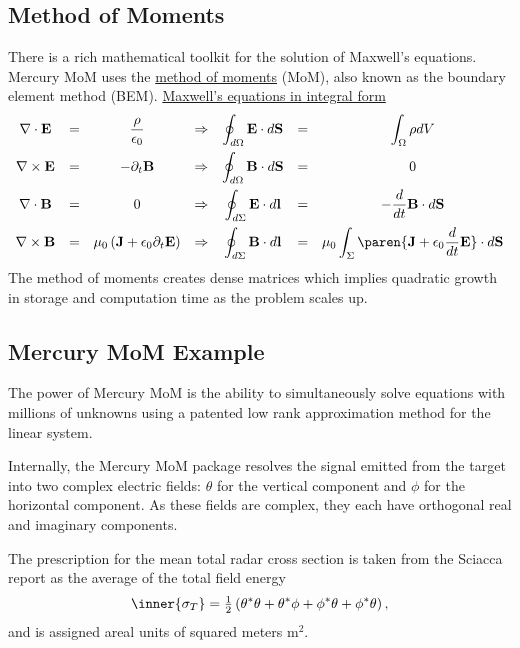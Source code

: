\subsection{Method of Moments}
There is a rich mathematical toolkit for the solution of Maxwell's equations. Mercury MoM uses the \href{https://en.wikipedia.org/wiki/Computational_electromagnetics#Method_of_moments_element_method}{method of moments} (MoM), also known as the boundary element method (BEM).
\href{https://en.wikipedia.org/wiki/Maxwell\%27s\_equations}{Maxwell's equations in integral form}
\begin{equation}
	\begin{array}{cccccccccc}
		\nabla \cdot \mathbf{E} &= &\displaystyle\frac{\rho}{\epsilon_{0}} 
			&\Rightarrow &\displaystyle{\oint_{d\Omega} \mathbf{E}\cdot d\mathbf{S}} &= &\displaystyle\int_{\Omega} \rho dV \\[10pt]
		\nabla \times \mathbf{E} &= &- \partial_{t}\mathbf{B} 
			&\Rightarrow &\displaystyle\oint_{d\Omega} \mathbf{B}\cdot d\mathbf{S} &= &0 \\[10pt]
		\nabla \cdot \mathbf{B} &= &0
			&\Rightarrow &\displaystyle\oint_{d\Sigma} \mathbf{E}\cdot d\mathbf{l} &= &\displaystyle-\frac{d}{dt} \mathbf{B}\cdot d\mathbf{S} \\[10pt]
		\nabla \times \mathbf{B} &= &\mu_{0} \left( \mathbf{J} + \epsilon_{0} \partial_{t}\mathbf{E} \right) 
			&\Rightarrow & \displaystyle\oint_{d\Sigma} \mathbf{B}\cdot d\mathbf{l} &= &\displaystyle\mu_{0} \int_{\Sigma} \paren{ \mathbf{J}+ \epsilon_{0} \frac{d}{dt}  \mathbf{E} } \cdot d\mathbf{S} \\
	\end{array}
\label{eq:Maxwell-differential}
\end{equation}
The method of moments creates dense matrices which implies quadratic growth in storage and computation time as the problem scales up. 

\subsection{Mercury MoM Example}
The power of Mercury MoM is the ability to simultaneously solve equations with millions of unknowns using a patented low rank approximation method for the linear system.

Internally, the Mercury MoM package resolves the signal emitted from the target into two complex electric fields: $\theta$ for the vertical component and $\phi$ for the horizontal component. As these fields are complex, they each have orthogonal real and imaginary components. 

The prescription for the mean total radar cross section is taken from the Sciacca report as the average of the total field energy
\begin{equation}
	\inner{ \sigma_{T} } = \tfrac{1}{2} \left( \theta^{*}\theta + \theta^{*}\phi + \phi^{*}\theta + \phi^{*}\theta \right),
\end{equation}
and is assigned areal units of squared meters m$^{2}$.


\endinput  %
